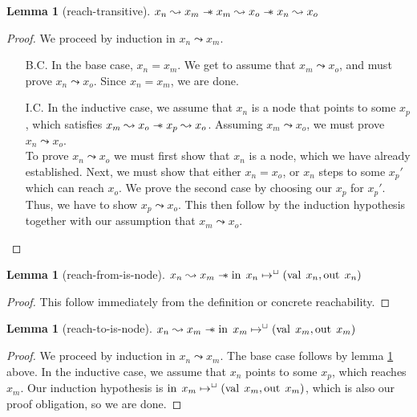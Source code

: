 \documentclass[twoside,11pt,openright]{report}
\newtheorem{lemma}[theorem]{Lemma}
\newcommand{\nIn}[1]{\operatorname{in} \; #1}
\newcommand{\nVal}[1]{\operatorname{val} \; #1}
\newcommand{\nOut}[1]{\operatorname{out} \; #1}
\newcommand{\isNode}[1]{\nIn{#1} \mapsto^{\persistently} (\nVal{#1}, \nOut{#1})}
\newcommand{\reach}[2]{#1 \leadsto #2}
\begin{document}
\begin{lemma}[reach-transitive]\label{lemma:reach-transitive}
  $\reach{x_n}{x_m} \wand \reach{x_m}{x_o} \wand \reach{x_n}{x_o}$
\end{lemma}
\begin{proof}
  We proceed by induction in $\reach{x_n}{x_m}$.
  \begin{itemize}
    \item[B.C.] In the base case, $x_n = x_m$. We get to assume that $\reach{x_m}{x_o}$, and must prove $\reach{x_n}{x_o}$. Since $x_n = x_m$, we are done.
    \item[I.C.] In the inductive case, we assume that $x_n$ is a node that points to some $x_p$, which satisfies $\reach{x_m}{x_o} \wand \reach{x_p}{x_o}$. Assuming $\reach{x_m}{x_o}$, we must prove $\reach{x_n}{x_o}$.\\
    To prove $\reach{x_n}{x_o}$ we must first show that $x_n$ is a node, which we have already established. Next, we must show that either $x_n = x_o$, or $x_n$ steps to some $x_p'$ which can reach $x_o$. We prove the second case by choosing our $x_p$ for $x_p'$. Thus, we have to show $\reach{x_p}{x_o}$. This then follow by the induction hypothesis together with our assumption that $\reach{x_m}{x_o}$.
  \end{itemize}
\end{proof}

\begin{lemma}[reach-from-is-node]\label{lemma:reach-from-is-node}
  $\reach{x_n}{x_m} \wand \isNode{x_n}$
\end{lemma}
\begin{proof}
  This follow immediately from the definition or concrete reachability.
\end{proof}

\begin{lemma}[reach-to-is-node]\label{lemma:reach-to-is-node}
  $\reach{x_n}{x_m} \wand \isNode{x_m}$
\end{lemma}
\begin{proof}
  We proceed by induction in $\reach{x_n}{x_m}$. The base case follows by lemma \ref{lemma:reach-from-is-node} above. In the inductive case, we assume that $x_n$ points to some $x_p$, which reaches $x_m$. Our induction hypothesis is $\isNode{x_m}$, which is also our proof obligation, so we are done.
\end{proof}
\end{document}

